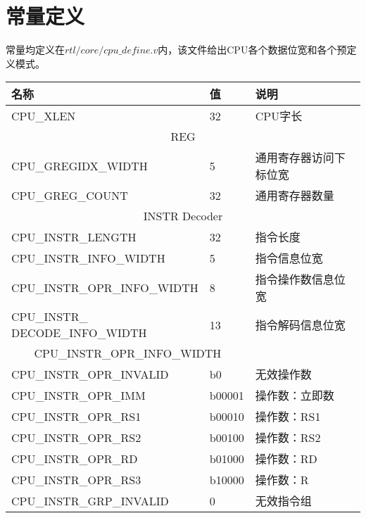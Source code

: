 \section{常量定义}
常量均定义在$rtl/core/cpu\_define.v$内，该文件给出CPU各个数据位宽和各个预定义模式。

\begin{table}[H]
    \centering
\begin{tabular}{|l|p{3cm}|p{6cm}|}
    \hline
    名称    &   值  &   说明\\\hline
    CPU\_XLEN   &   32  &   CPU字长\\\hline
    \multicolumn{3}{|c|}{REG}\\\hline
    CPU\_GREGIDX\_WIDTH &   5   &   通用寄存器访问下标位宽\\\hline
    CPU\_GREG\_COUNT    &   32  &   通用寄存器数量\\\hline
    \multicolumn{3}{|c|}{INSTR Decoder}\\\hline
    CPU\_INSTR\_LENGTH & 32 & 指令长度\\\hline
    CPU\_INSTR\_INFO\_WIDTH & 5 & 指令信息位宽\\\hline
    CPU\_INSTR\_OPR\_INFO\_WIDTH & 8 & 指令操作数信息位宽\\\hline
    \makecell[{}{p{3cm}}]{CPU\_INSTR\_ \\ DECODE\_INFO\_WIDTH} & 13 & 指令解码信息位宽\\\hline
    \multicolumn{2}{|c|}{CPU\_INSTR\_OPR\_INFO\_WIDTH}&\\\hline
    CPU\_INSTR\_OPR\_INVALID & b0 & 无效操作数\\\hline
    CPU\_INSTR\_OPR\_IMM & b00001 & 操作数：立即数\\\hline
    CPU\_INSTR\_OPR\_RS1 & b00010 & 操作数：RS1\\\hline
    CPU\_INSTR\_OPR\_RS2 & b00100 & 操作数：RS2\\\hline
    CPU\_INSTR\_OPR\_RD & b01000 & 操作数：RD\\\hline
    CPU\_INSTR\_OPR\_RS3 & b10000 & 操作数：R\\\hline
    CPU\_INSTR\_GRP\_INVALID & 0 & 无效指令组\\\hline
\end{tabular}
\end{table}

